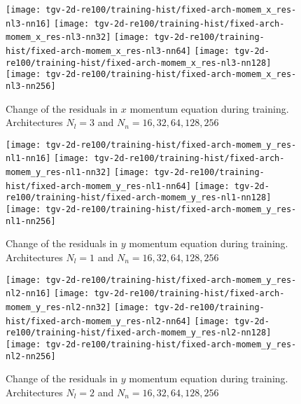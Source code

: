 \begin{figure}[H]
    \centering
        \texttt{[image: tgv-2d-re100/training-hist/fixed-arch-momem\_x\_res-nl3-nn16]}%
    \hfill
        \texttt{[image: tgv-2d-re100/training-hist/fixed-arch-momem\_x\_res-nl3-nn32]}%
    \hfill
        \texttt{[image: tgv-2d-re100/training-hist/fixed-arch-momem\_x\_res-nl3-nn64]}%
    \hfill
        \texttt{[image: tgv-2d-re100/training-hist/fixed-arch-momem\_x\_res-nl3-nn128]}%
    \newline
        \texttt{[image: tgv-2d-re100/training-hist/fixed-arch-momem\_x\_res-nl3-nn256]}%
    \caption{Change of the residuals in $x$ momentum equation during training. Architectures $N_l=3$ and $N_n=16,32,64,128,256$}
\end{figure}

\begin{figure}[H]
    \centering
        \texttt{[image: tgv-2d-re100/training-hist/fixed-arch-momem\_y\_res-nl1-nn16]}%
    \hfill
        \texttt{[image: tgv-2d-re100/training-hist/fixed-arch-momem\_y\_res-nl1-nn32]}%
    \newline
        \texttt{[image: tgv-2d-re100/training-hist/fixed-arch-momem\_y\_res-nl1-nn64]}%
    \hfill
        \texttt{[image: tgv-2d-re100/training-hist/fixed-arch-momem\_y\_res-nl1-nn128]}%
    \newline
        \texttt{[image: tgv-2d-re100/training-hist/fixed-arch-momem\_y\_res-nl1-nn256]}%
    \caption{Change of the residuals in $y$ momentum equation during training. Architectures $N_l=1$ and $N_n=16,32,64,128,256$}
\end{figure}

\begin{figure}[H]
    \centering
        \texttt{[image: tgv-2d-re100/training-hist/fixed-arch-momem\_y\_res-nl2-nn16]}%
    \hfill
        \texttt{[image: tgv-2d-re100/training-hist/fixed-arch-momem\_y\_res-nl2-nn32]}%
    \newline
        \texttt{[image: tgv-2d-re100/training-hist/fixed-arch-momem\_y\_res-nl2-nn64]}%
    \hfill
        \texttt{[image: tgv-2d-re100/training-hist/fixed-arch-momem\_y\_res-nl2-nn128]}%
    \newline
        \texttt{[image: tgv-2d-re100/training-hist/fixed-arch-momem\_y\_res-nl2-nn256]}%
    \caption{Change of the residuals in $y$ momentum equation during training. Architectures $N_l=2$ and $N_n=16,32,64,128,256$}
\end{figure}

